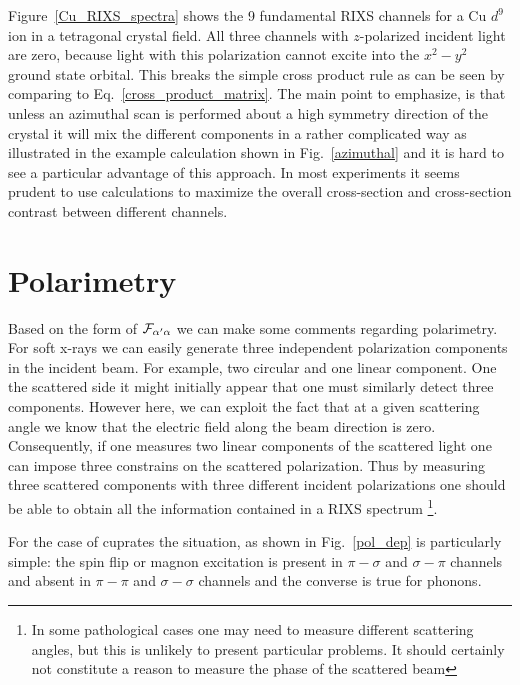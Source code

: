 \documentclass[aps,onecolumn, notitlepage, longbibliography]{revtex4-1}
\begin{document}
Figure~\ref{Cu_RIXS_spectra} shows the 9 fundamental RIXS channels for a Cu $d^9$ ion in a tetragonal crystal field. All three channels with $z$-polarized incident light are zero, because light with this polarization cannot excite into the $x^2-y^2$ ground state orbital. This breaks the simple cross product rule as can be seen by comparing to Eq.~\ref{cross_product_matrix}. The main point to emphasize, is that unless an azimuthal scan is performed about a high symmetry direction of the crystal it will mix the different components in a rather complicated way as illustrated in the example calculation shown in Fig.~\ref{azimuthal} and it is hard to see a particular advantage of this approach. In most experiments it seems prudent to use calculations to maximize the overall cross-section and cross-section contrast between different channels. 

\section{Polarimetry}
Based on the form of ${\cal F}_{\alpha^\prime\alpha}$ we can make some comments regarding polarimetry. For soft x-rays we can easily generate three independent polarization components in the incident beam. For example, two circular and one linear component. One the scattered side it might initially appear that one must similarly detect three components. However here, we can exploit the fact that at a given scattering angle we know that the electric field along the beam direction is zero. Consequently, if one measures two linear components of the scattered light one can impose three constrains on the scattered polarization. Thus by measuring three scattered components with three different incident polarizations one should be able to obtain all the information contained in a RIXS spectrum \footnote{In some pathological cases one may need to measure different scattering angles, but this is unlikely to present particular problems. It should certainly not constitute a reason to measure the phase of the scattered beam}. 

For the case of cuprates the situation, as shown in Fig.~\ref{pol_dep} is particularly simple: the spin flip or magnon excitation is present in $\pi-\sigma$ and $\sigma-\pi$ channels and absent in $\pi-\pi$ and $\sigma-\sigma$ channels and the converse is true for phonons. 
\end{document}
